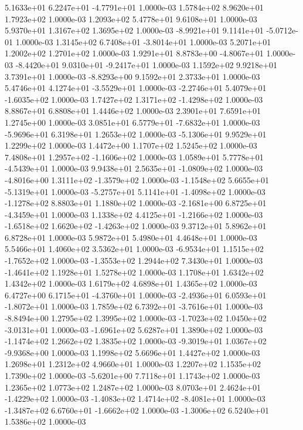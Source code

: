  5.1633e+01  6.2247e+01 -4.7791e+01  1.0000e-03
1.5784e+02 8.9620e+01 1.7923e+02  1.0000e-03
1.2093e+02 5.4778e+01 9.6108e+01  1.0000e-03
5.9370e+01 1.3167e+02 1.3695e+02  1.0000e-03
-8.9921e+01  9.1141e+01 -5.0712e-01  1.0000e-03
 1.3145e+02  6.7408e+01 -3.8014e+01  1.0000e-03
5.2071e+01 1.2002e+02 1.2701e+02  1.0000e-03
 1.9291e+01  8.8783e+00 -4.8067e+01  1.0000e-03
-8.4420e+01  9.0310e+01 -9.2417e+01  1.0000e-03
1.1592e+02 9.9218e+01 3.7391e+01  1.0000e-03
-8.8293e+00  9.1592e+01  2.3733e+01  1.0000e-03
 5.4746e+01  4.1274e+01 -3.5529e+01  1.0000e-03
-2.2746e+01  5.4079e+01 -1.6035e+02  1.0000e-03
 1.7427e+02  1.3171e+02 -1.4298e+02  1.0000e-03
8.8867e+01 6.8808e+01 1.4446e+02  1.0000e-03
2.3901e+01 7.6591e+01 1.2745e+00  1.0000e-03
 3.0851e+01  6.5779e+01 -7.6832e+01  1.0000e-03
-5.9696e+01  6.3198e+01  1.2653e+02  1.0000e-03
-5.1306e+01  9.9529e+01  1.2299e+02  1.0000e-03
1.4472e+00 1.1707e+02 1.5245e+02  1.0000e-03
 7.4808e+01  1.2957e+02 -1.1606e+02  1.0000e-03
 1.0589e+01  5.7778e+01 -4.5439e+01  1.0000e-03
 9.9438e+01  2.5635e+01 -1.0809e+02  1.0000e-03
-4.8016e+00  1.3111e+02 -1.3579e+02  1.0000e-03
-1.1548e+02  5.6655e+01 -5.1319e+01  1.0000e-03
-5.2757e+01  5.1141e+01 -1.4098e+02  1.0000e-03
-1.1278e+02  8.8803e+01  1.1880e+02  1.0000e-03
-2.1681e+00  6.8725e+01 -4.3459e+01  1.0000e-03
 1.1338e+02  4.4125e+01 -1.2166e+02  1.0000e-03
-1.6518e+02  1.6620e+02 -1.4263e+02  1.0000e-03
9.3712e+01 5.8962e+01 6.8728e+01  1.0000e-03
5.9872e+01 5.4980e+01 4.4648e+01  1.0000e-03
5.5466e+01 1.4060e+02 3.5362e+01  1.0000e-03
-6.9534e+01  1.1515e+02 -1.7652e+02  1.0000e-03
-1.3553e+02  1.2944e+02  7.3430e+01  1.0000e-03
-1.4641e+02  1.1928e+01  1.5278e+02  1.0000e-03
1.1708e+01 1.6342e+02 1.4342e+02  1.0000e-03
1.6179e+02 4.6898e+01 1.4365e+02  1.0000e-03
 6.4727e+00  6.1715e+01 -4.3760e+01  1.0000e-03
-2.4936e+01  6.0593e+01 -1.8072e+01  1.0000e-03
 1.7859e+02  6.7392e+01 -3.7616e+01  1.0000e-03
-8.8494e+00  1.2795e+02  1.3995e+02  1.0000e-03
-1.7023e+02  1.0450e+02 -3.0131e+01  1.0000e-03
-1.6961e+02  5.6287e+01  1.3890e+02  1.0000e-03
-1.1474e+02  1.2662e+02  1.3835e+02  1.0000e-03
-9.3019e+01  1.0367e+02 -9.9368e+00  1.0000e-03
1.1998e+02 5.6696e+01 1.4427e+02  1.0000e-03
1.2698e+01 1.2312e+02 4.9660e+01  1.0000e-03
1.2207e+02 1.1535e+02 1.7390e+02  1.0000e-03
-5.6201e+00  7.7118e+01  1.1743e+02  1.0000e-03
1.2365e+02 1.0773e+02 1.2487e+02  1.0000e-03
 8.0703e+01  2.4624e+01 -1.4229e+02  1.0000e-03
-1.4083e+02  1.4714e+02 -8.4081e+01  1.0000e-03
-1.3487e+02  6.6760e+01 -1.6662e+02  1.0000e-03
-1.3006e+02  6.5240e+01  1.5386e+02  1.0000e-03

